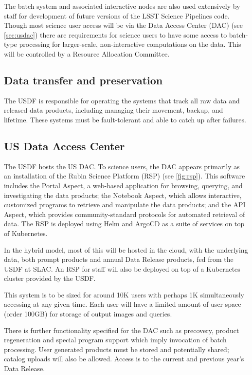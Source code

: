 The batch system and associated interactive nodes are also used extensively by staff for development of future versions of the LSST Science Pipelines code.\cite{2019ASPC..523..521B}
Though most science user access will be via the Data Access Center (DAC) (see \autoref{sec:usdac})
there are requirements for science users to have some access to batch-type processing for larger-scale, non-interactive computations on the data.\cite{DMTN-223}
This will be controlled by a Resource Allocation Committee.

\subsection{Data transfer and preservation} \label{req:dbb}
The USDF is responsible for operating the systems that track all raw data and released data products, including managing their movement, backup, and lifetime.
These systems must be fault-tolerant and able to catch up after failures.

\subsection{US Data Access Center}\label{sec:usdac}
The USDF hosts the US DAC.
To science users, the DAC appears primarily as an installation of the Rubin Science Platform (RSP)\cite{LDM-542} (see \autoref{fig:rsp}).
This software includes the Portal Aspect, a web-based application for browsing, querying, and investigating the data products; the Notebook Aspect, which allows interactive, customized programs to retrieve and manipulate the data products; and the API Aspect, which provides community-standard protocols for automated retrieval of data.
The RSP is deployed using Helm and ArgoCD as a suite of services on top of Kubernetes.

In the hybrid model, most of this will be hosted in the cloud, with the underlying data, both prompt products and annual Data Release products, fed from the USDF at SLAC.
An RSP for staff will also be deployed on top of a Kubernetes cluster provided by the USDF.

This system is to be sized for around 10K users with perhaps 1K simultaneously accessing at any given time.
Each user will have a limited amount of user space (order 100GB) for storage of output images and queries.

There is further functionality specified for the DAC such as precovery, product regeneration and special program support which imply invocation
of batch processing.
User generated products must be stored and potentially shared; catalog uploads will also be allowed.
Access is to the current and previous year's Data Release.
